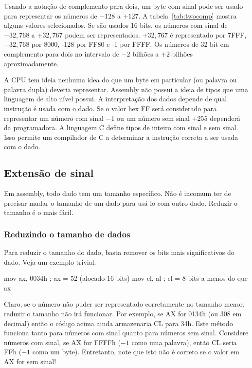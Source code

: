 Usando a notação de complemento para dois, um byte com sinal pode ser usado para
representar os números de $-128$ a $+127$. A tabela~\ref{tab:twocomp} mostra alguns
valores selecionados. Se são usados 16 bits, os números com sinal de $-32,768$ a 
$+32,767$ podem ser representados. $+32,767$ é representado por 7FFF, 
$-32,768$ por 8000, -128 por FF80 e -1 por FFFF. Os números de 32 bit em complemento 
para dois no intervalo de $-2$ bilhões a $+2$ bilhões aproximadamente. 


A CPU tem ideia nenhuma idea do que um byte em particular (ou palavra ou palavra dupla) 
deveria representar. Assembly não possui a ideia de tipos que uma
linguagem de alto nível possui. A interpretação dos dados depende de qual instrução
é usada com o dado. Se o valor hex FF será considerado para representar
um número com sinal $-1$ ou um número sem sinal $+255$ dependerá da programadora. A linguagem C 
define tipos de inteiro com sinal e sem sinal. Isso permite um compilador de C a 
determinar a instrução correta a ser usada com o dado.


\subsection{Extensão de sinal }

Em assembly, todo dado tem um tamanho específico. Não é incomum ter de precisar 
mudar o tamanho de um dado para usá-lo com outro dado. Reduzir o tamanho é o 
mais fácil.

\subsubsection{Reduzindo o tamanho de dados}

Para reduzir o tamanho do dado, basta remover os bits mais significativos do
dado. Veja um exemplo trivial:
\begin{AsmCodeListing}[numbers=none,frame=none]
      mov    ax, 0034h      ; ax = 52 (alocado 16 bits)
      mov    cl, al         ; cl = 8-bits a menos do que ax
\end{AsmCodeListing}

Claro, se o número não puder ser representado corretamente no tamanho
menor, reduzir o tamanho não irá funcionar. Por exemplo, se {\code AX}
for 0134h (ou 308 em decimal) então o código acima ainda armazenaria 
{\code CL} para 34h. Este método funciona tanto para números com sinal
quanto para números sem sinal. Considere números com sinal, se {\code AX} for FFFFh ($-1$ como uma
palavra), então {\code CL} seria FFh ($-1$ como um byte). Entretanto, note
que isto não é correto se o valor em {\code AX} for sem sinal!

